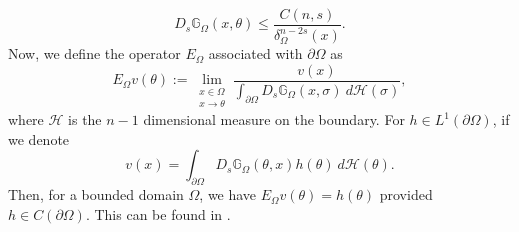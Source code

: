 \documentclass{amsart}
\newcommand{\gk}[1]{\mathbb{G}_{#1}}
\newcommand{\Ds}{D_{s}}
\begin{document}
\begin{equation}\label{eqn martin behaviour}
    \Ds \gk{\Omega}(x,\theta)\leq\frac{C(n,s)}{\delta_{\Omega}^{n-2s}(x)}.
\end{equation}
Now, we define the operator $E_{\Omega}$ associated with $\partial\Omega$  as 
\begin{equation}\label{dfn E}
    E_{\Omega}v(\theta):=\lim _{\substack{x\in \Omega \\ x \to \theta}}\frac{v(x)}{\int_{\partial\Omega}\Ds\gk{\Omega}(x,\sigma)\ d\mathcal{H}(\sigma)},
\end{equation}
where $\mathcal{H}$ is the $n-1$ dimensional measure on the boundary.
For $h\in L^{1}(\partial\Omega)$, if we denote 
\begin{equation*}
    v(x)=\int_{\partial\Omega}\Ds\gk{\Omega}(\theta,x)h(\theta)\ d\mathcal{H}(\theta).
\end{equation*} 
Then, for a bounded domain $\Omega$, we have  $E_{\Omega}v(\theta)=h(\theta)$ provided $h\in C(\partial \Omega)$. This can be found in \cite[Lemma 3.4]{Abatangelo2015LargesHarmonic}.
\end{document}
